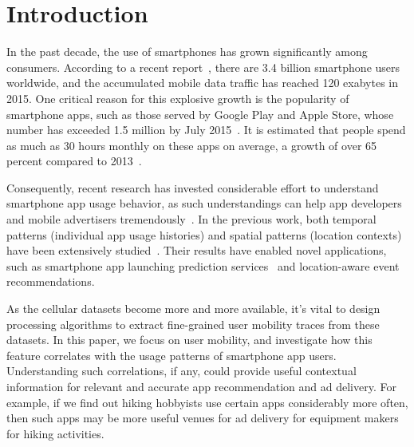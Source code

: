 \section{Introduction}\label{intro}

In the past decade, the use of smartphones has grown significantly among consumers.
According to a recent report~\cite{Ericsson}, there are 3.4 billion smartphone users worldwide,
and the accumulated mobile data traffic has reached 120 exabytes in 2015.
One critical reason for this explosive growth is the popularity of smartphone apps,
such as those served by Google Play and Apple Store,
whose number has exceeded 1.5 million by July 2015~\cite{Statista}.
It is estimated that people spend as much as 30 hours monthly on these apps on average,
a growth of over 65 percent compared to 2013~\cite{Nielsen}.

Consequently, recent research has invested considerable effort to understand smartphone app usage behavior,
as such understandings can help app developers and mobile advertisers tremendously~\cite{xu2011identifying,yang2015characterizing}.
In the previous work, both temporal patterns (\eg individual app usage histories) and
spatial patterns (\eg location contexts) have been extensively studied~\cite{meng2014analyzing}.
Their results have enabled novel applications,
such as smartphone app launching prediction services~\cite{yan2012fast}
and location-aware event recommendations.

As the cellular datasets become more and more available, it’s vital to design processing algorithms to extract fine-grained user mobility traces from these datasets. In this paper, we focus on user mobility,
and investigate how this feature correlates with the usage patterns of smartphone app users.
Understanding such correlations, if any, could provide useful contextual information
for relevant and accurate app recommendation and ad delivery.
For example, if we find out hiking hobbyists use certain apps considerably more often,
then such apps may be more useful venues for ad delivery for equipment makers for hiking activities.

